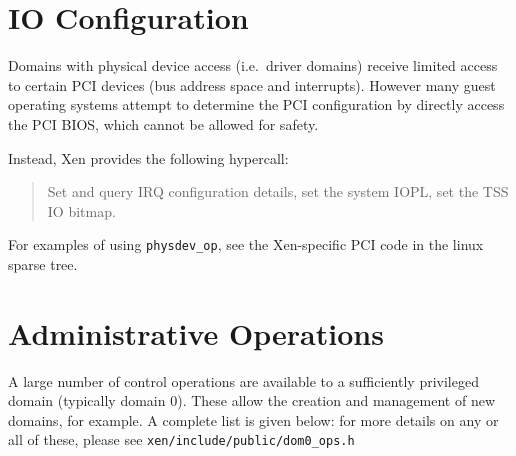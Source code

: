 \documentclass[11pt,twoside,final,openright]{report}
\newcommand{\hypercall}[1]{\vspace{2mm}{\sf #1}}
\begin{document}
\section{IO Configuration} 

Domains with physical device access (i.e.\ driver domains) receive
limited access to certain PCI devices (bus address space and
interrupts). However many guest operating systems attempt to 
determine the PCI configuration by directly access the PCI BIOS, 
which cannot be allowed for safety. 

Instead, Xen provides the following hypercall: 

\begin{quote}
\hypercall{physdev\_op(void *physdev\_op)}

Set and query IRQ configuration details, set the system IOPL, set the
TSS IO bitmap.

\end{quote} 


For examples of using {\tt physdev\_op}, see the 
Xen-specific PCI code in the linux sparse tree. 

\section{Administrative Operations}
\label{s:dom0ops}

A large number of control operations are available to a sufficiently
privileged domain (typically domain 0). These allow the creation and
management of new domains, for example. A complete list is given 
below: for more details on any or all of these, please see 
{\tt xen/include/public/dom0\_ops.h} 
\end{document}
